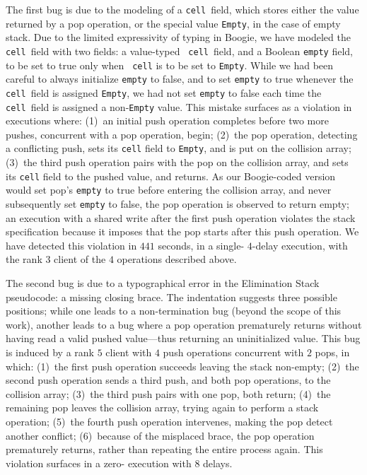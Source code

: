 The first bug is due to the modeling of a {\tt cell}~field, which stores either
the value returned by a pop operation, or the special value {\tt Empty}, in the
case of empty stack. Due to the limited expressivity of typing in Boogie, we
have modeled the {\tt cell}~field with two fields: a value-typed {\tt
cell}~field, and a Boolean {\tt empty} field, to be set to true only when {\tt
cell} is to be set to {\tt Empty}. While we had been careful to always
initialize {\tt empty} to false, and to set {\tt empty} to true whenever the
{\tt cell}~field is assigned {\tt Empty}, we had not set {\tt empty} to false
each time the {\tt cell}~field is assigned a non-{\tt Empty} value. This
mistake surfaces as a violation in executions where: (1)~an
initial push operation completes before two more pushes, concurrent with a pop
operation, begin; (2)~the pop operation, detecting a conflicting push, sets its
{\tt cell} field to {\tt Empty}, and is put on the collision array; (3)~the
third push operation pairs with the pop on the collision array, and sets its
{\tt cell} field to the pushed value, and returns. As our Boogie-coded
version would set pop's {\tt empty} to true before entering the collision
array, and never subsequently set {\tt empty} to false, the pop operation is
observed to return empty; an execution with a shared write 
after the first push operation violates the stack specification because it imposes that 
the pop starts after this push operation. We have
detected this violation in $441$ seconds, in a single-{\shwrite} $4$-delay
execution, with the rank $3$ client of the $4$ operations described above.

The second bug is due to a typographical error in the Elimination Stack
pseudocode: a missing closing brace. The indentation suggests three possible
positions; while one leads to a non-termination bug (beyond the scope of this
work), another leads to a bug where a pop operation prematurely returns without
having read a valid pushed value---thus returning an uninitialized value. This
bug is induced by a rank $5$ client with $4$ push operations concurrent with
$2$ pops, in which: (1)~the first push operation succeeds leaving the stack
non-empty; (2)~the second push operation sends a third push, and both pop
operations, to the collision array; (3)~the third push pairs with one pop, both
return; (4)~the remaining pop leaves the collision array, trying again to
perform a stack operation; (5)~the fourth push operation intervenes, making the
pop detect another conflict; (6)~because of the misplaced brace, the pop
operation prematurely returns, rather than repeating the entire process again.
This violation surfaces in a zero-{\shwrite} execution with $8$ delays. %

